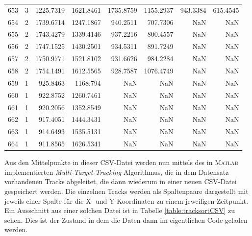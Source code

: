 \begin{table}[]
\begin{tabular}{@{}rcrrrrrr@{}}
    653     & 3    & 1225.7319 & 1621.8461 & 1735.8759 & 1155.2937 & 943.3384 & 615.4545 \\
    654     & 2    & 1739.6714 & 1247.1867 & 940.2511  & 707.7306  & NaN      & NaN      \\
    655     & 2    & 1743.4279 & 1339.4146 & 937.2216  & 800.4557  & NaN      & NaN      \\
    656     & 2    & 1747.1525 & 1430.2501 & 934.5311  & 891.7249  & NaN      & NaN      \\
    657     & 2    & 1750.9771 & 1521.8102 & 931.6626  & 984.2284  & NaN      & NaN      \\
    658     & 2    & 1754.1491 & 1612.5565 & 928.7587  & 1076.4749 & NaN      & NaN      \\
    659     & 1    & 925.8463  & 1168.794  & NaN       & NaN       & NaN      & NaN      \\
    660     & 1    & 922.8752  & 1260.7461 & NaN       & NaN       & NaN      & NaN      \\
    661     & 1    & 920.2056  & 1352.8549 & NaN       & NaN       & NaN      & NaN      \\
    662     & 1    & 917.4051  & 1444.3431 & NaN       & NaN       & NaN      & NaN      \\
    663     & 1    & 914.6493  & 1535.5131 & NaN       & NaN       & NaN      & NaN      \\
    664     & 1    & 911.8565  & 1626.5341 & NaN       & NaN       & NaN      & NaN      \\ \bottomrule
    \end{tabular}
    \normalsize
    
    \label{table:Segmentierungsscript}
    \end{table}
    

Aus den Mittelpunkte in dieser CSV-Datei werden nun mittels des in \textsc{Matlab} implementierten \textit{Multi-Target-Tracking} Algorithmus, die in dem Datensatz vorhandenen Tracks abgeleitet,
die dann wiederum in einer neuen CSV-Datei gespeichert werden.
Die einzelnen Tracks werden als Spaltenpaare dargestellt mit jeweils einer Spalte für die X- und Y-Koordinaten zu einem jeweiligen Zeitpunkt.
Ein Ausschnitt aus einer solchen Datei ist in Tabelle \ref{table:tracksortCSV} zu sehen.
Dies ist der Zustand in dem die Daten dann im eigentlichen Code geladen werden. 


